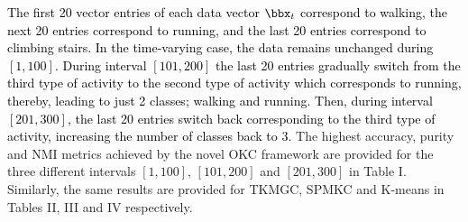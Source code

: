 \documentclass[10pt,final]{IEEEtran}
\begin{document}
\textcolor{black}{The first 20 vector entries of each data vector $\bbx_t$ correspond to walking, the next 20 entries correspond to running, and the last 20 entries correspond to climbing stairs. In the time-varying case, the data remains unchanged during $[1,100]$. During interval $[101,200]$ the last 20 entries gradually switch from the third type of activity to the second type of activity which corresponds to running, thereby, leading to just 2 classes; walking and running. Then, during interval $[201,300]$, the last 20 entries switch back corresponding to the third type of activity, increasing the number of classes back to 3.} The highest accuracy, purity and NMI metrics achieved by the novel OKC framework are provided for the three different intervals  $[1,100]$, $[101,200]$ and $[201,300]$ in Table I. Similarly, the same results are provided for TKMGC, SPMKC and K-means in Tables II, III and IV respectively. 
\end{document}
